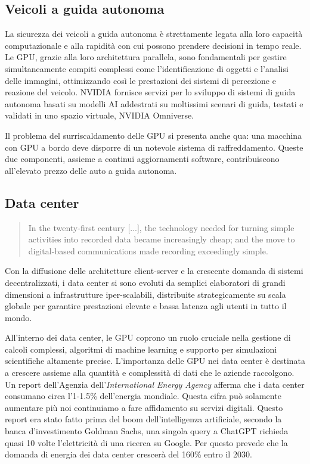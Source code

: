 \documentclass[12pt,a4paper,oneside]{book}
\begin{document}
\subsection{Veicoli a guida autonoma}

La sicurezza dei veicoli a guida autonoma è strettamente legata alla loro capacità computazionale e alla rapidità con cui possono prendere decisioni in tempo reale. Le GPU, grazie alla loro architettura parallela, sono fondamentali per gestire simultaneamente compiti complessi come l’identificazione di oggetti e l’analisi delle immagini, ottimizzando così le prestazioni dei sistemi di percezione e reazione del veicolo. NVIDIA fornisce servizi per lo sviluppo di sistemi di guida autonoma basati su modelli AI addestrati su moltissimi scenari di guida, testati e validati in uno spazio virtuale, NVIDIA Omniverse.

Il problema del surriscaldamento delle GPU si presenta anche qua: una macchina con GPU a bordo deve disporre di un notevole sistema di raffreddamento. Queste due componenti, assieme a continui aggiornamenti software, contribuiscono all'elevato prezzo delle auto a guida autonoma.

\subsection{Data center}

\begin{quote}
\small
In the twenty-first century [...], the technology needed for turning simple activities into recorded data became increasingly cheap; and the move to digital-based communications made recording exceedingly simple.\citep[p.28]{srnicek2017platform}
\end{quote}

Con la diffusione delle architetture client-server e la crescente domanda di sistemi decentralizzati, i data center si sono evoluti da semplici elaboratori di grandi dimensioni a infrastrutture iper-scalabili, distribuite strategicamente su scala globale per garantire prestazioni elevate e bassa latenza agli utenti in tutto il mondo.

All'interno dei data center, le GPU coprono un ruolo cruciale nella gestione di calcoli complessi, algoritmi di machine learning e supporto per simulazioni scientifiche altamente precise. L'importanza delle GPU nei data center è destinata a crescere assieme alla quantità e complessità di dati che le aziende raccolgono. Un report dell'Agenzia dell'\textit{International Energy Agency} afferma che i data center consumano circa l'1-1.5\% dell'energia mondiale. Questa cifra può solamente aumentare più noi continuiamo a fare affidamento su servizi digitali. Questo report era stato fatto prima del boom dell'intelligenza artificiale, secondo la banca d'investimento Goldman Sachs, una singola query a ChatGPT richieda quasi 10 volte l'elettricità di una ricerca su Google. Per questo prevede che la domanda di energia dei data center crescerà del 160\% entro il 2030.
\end{document}
